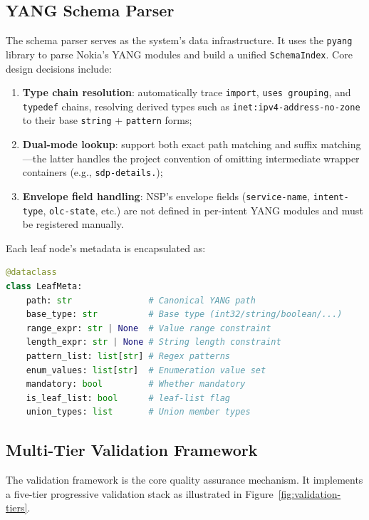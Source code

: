 \documentclass[12pt, a4paper]{article}
\newcommand{\yang}{\textsc{YANG}}
\newcommand{\nsp}{\textsc{NSP}}
\begin{document}
\subsection{YANG Schema Parser}
\label{sec:yang-parser}

The schema parser serves as the system's data infrastructure. It uses the \texttt{pyang} library to parse Nokia's \yang{} modules and build a unified \texttt{SchemaIndex}. Core design decisions include:

\begin{enumerate}
  \item \textbf{Type chain resolution}: automatically trace \texttt{import}, \texttt{uses grouping}, and \texttt{typedef} chains, resolving derived types such as \texttt{inet:ipv4-address-no-zone} to their base \texttt{string} + \texttt{pattern} forms;
  \item \textbf{Dual-mode lookup}: support both exact path matching and suffix matching---the latter handles the project convention of omitting intermediate wrapper containers (e.g., \texttt{sdp-details.});
  \item \textbf{Envelope field handling}: \nsp{}'s envelope fields (\texttt{service-name}, \texttt{intent-type}, \texttt{olc-state}, etc.) are not defined in per-intent \yang{} modules and must be registered manually.
\end{enumerate}

\noindent
Each leaf node's metadata is encapsulated as:

\begin{lstlisting}[language=Python, caption={LeafMeta data structure}]
@dataclass
class LeafMeta:
    path: str               # Canonical YANG path
    base_type: str          # Base type (int32/string/boolean/...)
    range_expr: str | None  # Value range constraint
    length_expr: str | None # String length constraint
    pattern_list: list[str] # Regex patterns
    enum_values: list[str]  # Enumeration value set
    mandatory: bool         # Whether mandatory
    is_leaf_list: bool      # leaf-list flag
    union_types: list       # Union member types
\end{lstlisting}

\subsection{Multi-Tier Validation Framework}
\label{sec:validation}

The validation framework is the core quality assurance mechanism. It implements a five-tier progressive validation stack as illustrated in Figure~\ref{fig:validation-tiers}.
\end{document}
